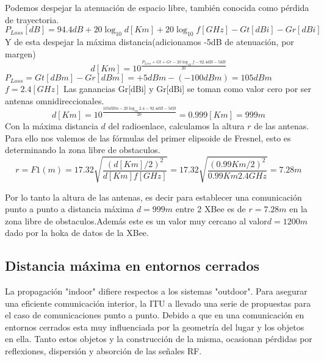 \documentclass[preprint,12pt]{elsarticle}
\begin{document}
Podemos despejar la atenuaci\'on de espacio libre, tambi\'en conocida como p\'erdida de trayectoria\cite{bilb:Free}.
\begin{equation*}
\label{Ec:perdida}
P_{Loss}[dB] = 94.4 dB + 20 \log_{10}d [Km] + 20 \log_{10}f [GHz] - Gt[dBi] - Gr[dBi]
\end{equation*}
	Y de esta despejar la m\'axima distancia(adicionamos -5dB de atenuaci\'on, por margen)
\begin{equation*}
\label{Ec:distancia}
d[Km] = 10^{\frac{P_{Loss} + Gt + Gr - 20 \log_{10}f - 92.4dB -5dB}{20}}
\end{equation*}
$P_{Loss}=Gt[dBm] - Gr[dBm] = +5dBm - (-100dBm) = 105dBm$
$f = 2.4 [GHz]$
Las ganancias Gr[dBi] y Gr[dBi] se toman como valor cero por ser antenas omnidireccionales.
\begin{equation*}
\label{Ec:distancia1}
d[Km] = 10^{\frac{105 dBm - 20 \log_{10}2.4 - 92.4dB-5dB}{20}} = 0.999 [Km] =999m
\end{equation*}	
Con la m\'axima distancia $d$ del radioenlace, calculamos la altura $r$ de las antenas. Para ello nos valemos de las f\'ormulas del primer elipsoide de Fresnel, esto es determinando la zona libre de obstaculos\cite{bilb:Fresnel}.
\begin{equation*}
\label{Ec:fresnel}
r = F1(m) = 17.32 \sqrt{\frac{(d[Km]/2)^2}{d[Km]f[GHz]}} = 17.32 \sqrt{\frac{(0.99Km/2)^2}{0.99Km2.4GHz}} = 7.28m
\end{equation*}	

Por lo tanto la altura de las antenas, es decir para establecer una comunicaci\'on punto a punto a distancia m\'axima $d=999m$ entre 2 XBee es de $r=7.28m$ en la zona libre de obstaculos.Adem\'as este es un valor muy cercano al valor$d=1200m$ dado por la hoka de datos de la XBee.

\subsection{Distancia m\'axima en entornos cerrados}

La propagaci\'on "indoor" difiere respectos a los sistemas "outdoor". Para asegurar una eficiente comunicaci\'on interior, la ITU a llevado una serie de propuestas para el caso de comunicaciones punto a punto. Debido a que en una comunicaci\'on en entornos cerrados esta muy influenciada por la geometr\'ia del lugar y los objetos en ella. Tanto estos objetos y la construcci\'on de la misma, ocasionan p\'erdidas por reflexiones, dispersi\'on y absorci\'on de las se\~nales RF.  
\end{document}
